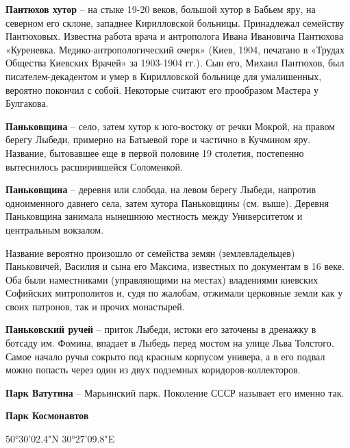 \medskip

\textbf{Пантюхов хутор} – на стыке 19-20 веков, большой хутор в Бабьем яру, на северном его склоне, западнее Кирилловской больницы. Принадлежал семейству Пантюховых. Известна работа врача и антрополога Ивана Ивановича Пантюхова «Куреневка. Медико-антропологи\-ческий очерк» (Киев, 1904, печатано в «Трудах Общества Киевских Врачей» за 1903-1904 гг.). Сын его, Михаил Пантюхов, был писателем-декадентом и умер в Кирилловской больнице для умалишенных, вероятно покончил с собой. Некоторые считают его прообразом Мастера у Булгакова.\\

\medskip

\textbf{Паньковщина} – село, затем хутор к юго-востоку от речки Мокрой, на правом берегу Лыбеди, примерно на Батыевой горе и частично в Кучмином яру. Название, бытовавшее еще в первой половине 19 столетия, постепенно вытеснилось расширившейся Соломенкой.\\

\medskip

\textbf{Паньковщина} – деревня или слобода, на левом берегу Лыбеди, напротив одноименного давнего села, затем хутора Паньковщины (см. выше). Деревня Паньковщина занимала нынешнюю местность между Университетом и центральным вокзалом.

Название вероятно произошло от семейства земян (землевладельцев) Паньковичей, Василия и сына его Максима, известных по документам в 16 веке. Оба были наместниками (управляющими на местах) владениями киевских Софийских митрополитов и, судя по жалобам, отжимали церковные земли как у своих патронов, так и прочих монастырей.\\

\medskip

\textbf{Паньковский ручей} – приток Лыбеди, истоки его заточены в дренажку в ботсаду им. Фомина, впадает в Лыбедь перед мостом на улице Льва Толстого. Самое начало ручья сокрыто под красным корпусом универа, а в его подвал можно попасть через один из двух подземных коридоров-коллекторов.\\

\medskip

\textbf{Парк Ватутина} – Марьинский парк. Поколение СССР называет его именно так.\\

\medskip


\textbf{Парк Космонавтов}

50°30'02.4"N 30°27'09.8"E

